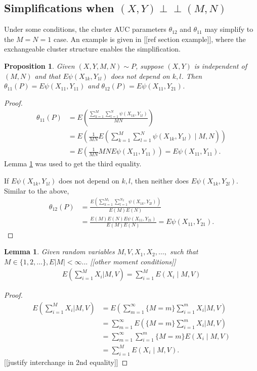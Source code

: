 \message{ !name(manuscript.tex)}\documentclass[12pt]{article}
\DeclareMathOperator{\AUC}{AUC}
\newcommand{\E}{E}
\renewcommand{\P}{P}
\newcommand{\cind}{\perp \!\!\! \perp}
\newcommand{\aucindiv}{\theta_{11}}%
\newcommand{\aucpop}{\theta_{12}}%
\newcommand{\kernel}{\psi}
\newtheorem{proposition}[theorem]{Proposition}
\newtheorem{lemma}[theorem]{Lemma}
\begin{document}
\subsection{Simplifications when $(X,Y)\cind (M,N)$}

Under some conditions, the cluster AUC parameters $\aucpop$ and
$\aucindiv$ may simplify to the $M=N=1$ case. An example is given in
[[ref section example]], where the exchangeable cluster structure
enables the simplification.
\begin{proposition}\label{proposition:reduction} Given $(X,Y,M,N)\sim \P$, suppose $(X,Y)$ is independent of $(M,N)$ and that $\E\kernel(X_{1k},Y_{1l})$ does not depend on $k,l$. Then $\aucindiv(\P)=\E\kernel(X_{11},Y_{11})$ and $\aucpop(\P)=\E\kernel(X_{11},Y_{21})$.
\end{proposition}

\begin{proof}
  \begin{align}
    \aucindiv(\P) &= \E\left(\frac{\sum_{k=1}^M\sum_{l=1}^N\kernel(X_{1k},Y_{1l})}{MN}\right)\\
                  &=\E\left(\frac{1}{MN}\E\left(\sum_{k=1}^M\sum_{l=1}^N\kernel(X_{1k},Y_{1l}) \mid M,N\right)\right)\\
                  &=\E\left(\frac{1}{MN}MN\E\kernel(X_{11},Y_{11})\right) = \E\kernel(X_{11},Y_{11}).                    
  \end{align}
  Lemma \ref{lemma:conditional wald} was used to get the third equality.

  If $\E\kernel(X_{1k},Y_{1l})$ does not depend on $k,l$, then neither does $\E\kernel(X_{1k},Y_{2l})$. Similar to the above,
  \begin{align}
    \aucpop(\P) &= \frac{\E\left(\sum_{k=1}^{M_1}\sum_{l=1}^{N_2}\kernel(X_{1k},Y_{2l})\right)}{\E(M)\E(N)}\\
    &=\frac{\E(M)\E(N)\E\kernel(X_{11},Y_{21})}{\E(M)\E(N)} = \E\kernel(X_{11},Y_{21}).
  \end{align}
\end{proof}


\begin{lemma}\label{lemma:conditional wald}
  Given random variables $M,V,X_1,X_2,\ldots,$ such that $M\in\{1,2,\ldots\}, \E|M|<\infty ...$ [[other moment conditions]]
  \begin{align}
    \E\left(\sum_{i=1}^M X_i \bigg\vert M,V\right) = \sum_{i=1}^M \E(X_i\mid M,V)
  \end{align}
\end{lemma}
\begin{proof}
  \begin{align}
    \E\left(\sum_{i=1}^M X_i\bigg\vert M,V\right)
    &=  \E\left(\sum_{m=1}^\infty\{M=m\}\sum_{i=1}^m X_i\bigg\vert M,V\right)\\
    &= \sum_{m=1}^\infty \E\left(\{M=m\}\sum_{i=1}^m X_i\bigg\vert M,V\right)\\
    &=\sum_{m=1}^\infty \sum_{i=1}^m\{M=m\}\E(X_i\mid M,V)\\
    &=\sum_{i=1}^M\E(X_i\mid M,V).
  \end{align}
  [[justify interchange in 2nd equality]]
\end{proof}
\end{document}
